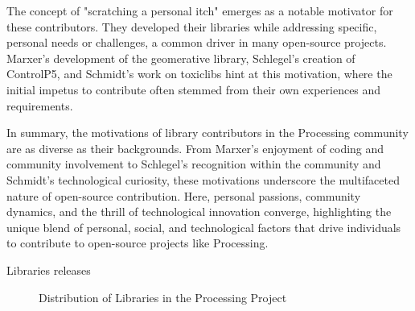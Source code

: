The concept of "scratching a personal itch" emerges as a notable motivator for these contributors. They developed their libraries while addressing specific, personal needs or challenges, a common driver in many open-source projects. Marxer's development of the geomerative library, Schlegel's creation of ControlP5, and Schmidt's work on toxiclibs hint at this motivation, where the initial impetus to contribute often stemmed from their own experiences and requirements.

In summary, the motivations of library contributors in the Processing community are as diverse as their backgrounds. From Marxer's enjoyment of coding and community involvement to Schlegel's recognition within the community and Schmidt's technological curiosity, these motivations underscore the multifaceted nature of open-source contribution. Here, personal passions, community dynamics, and the thrill of technological innovation converge, highlighting the unique blend of personal, social, and technological factors that drive individuals to contribute to open-source projects like Processing.

\changepapersize{305.3mm:210mm}

{
	\LARGE
	\noindent Libraries releases
}

\begin{figure}[H]
	
	\caption{Distribution of Libraries in the Processing Project}
	\label{figure:libraries}
\end{figure}

